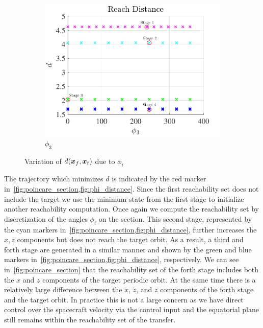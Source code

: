 \documentclass[]{aiaa-tc}%
\begin{document}
\begin{figure}[htbp]
\begin{subfigure}[htbp]{0.3\textwidth}
        \includegraphics[width=\textwidth]{figures/phi3.pdf} 
        \caption{\( \phi_3 \)} \label{fig:phi3} 
    \end{subfigure} 
    \caption{Variation of \(d(\bm{x}_f,\bm{x}_t)\) due to \( \phi_i\)}
    \label{fig:phi_distance} 
\end{figure}

The trajectory which minimizes \( d \) is indicated by the red marker in~\cref{fig:poincare_section,fig:phi_distance}.
Since the first reachability set does not include the target we use the minimum state from the first stage to initialize another reachability computation.
Once again we compute the reachability set by discretization of the angles \( \phi_i \) on the \Poincare section.
This second stage, represented by the cyan markers in~\cref{fig:poincare_section,fig:phi_distance}, further increases the \( x, z\) components but does not reach the target orbit.
As a result, a third and forth stage are generated in a similar manner and shown by the green and blue markers in~\cref{fig:poincare_section,fig:phi_distance}, respectively.
We can see in~\cref{fig:poincare_section} that the reachability set of the forth stage includes both the \( x \) and \( z\) components of the target periodic orbit.
At the same time there is a relatively large difference between the \( \dot{x} \), \( \dot{z} \), and \( z \) components of the forth stage and the target orbit.
In practice this is not a large concern as we have direct control over the spacecraft velocity via the control input and the equatorial plane still remains within the reachability set of the transfer.
\end{document}
